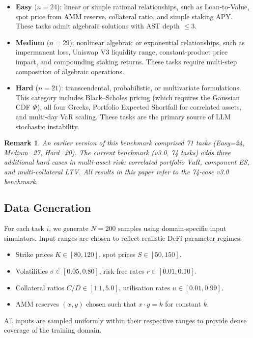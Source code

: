 \documentclass[twoside,11pt]{article}
\newtheorem{remark}[theorem]{Remark}
\begin{document}
\begin{itemize}
  \item \textbf{Easy} ($n=24$): linear or simple rational relationships, such as
    Loan-to-Value, spot price from AMM reserve, collateral ratio, and simple staking APY.
    These tasks admit algebraic solutions with AST depth $\le 3$.

  \item \textbf{Medium} ($n=29$): nonlinear algebraic or exponential relationships,
    such as impermanent loss, Uniswap V3 liquidity range, constant-product price impact,
    and compounding staking returns.  These tasks require multi-step composition
    of algebraic operations.

  \item \textbf{Hard} ($n=21$): transcendental, probabilistic, or multivariate
    formulations.  This category includes Black--Scholes pricing (which requires
    the Gaussian CDF $\Phi$), all four Greeks, Portfolio Expected Shortfall for
    correlated assets, and multi-day VaR scaling.  These tasks are the primary
    source of LLM stochastic instability.
\end{itemize}

\begin{remark}
An earlier version of this benchmark comprised 71 tasks (Easy=24, Medium=27,
Hard=20).  The current benchmark (v3.0, 74 tasks) adds three additional hard
cases in multi-asset risk: correlated portfolio VaR, component ES, and
multi-collateral LTV.  All results in this paper refer to the 74-case v3.0 benchmark.
\end{remark}

\subsection{Data Generation}

For each task $i$, we generate $N=200$ samples using domain-specific input
simulators.  Input ranges are chosen to reflect realistic DeFi parameter regimes:
\begin{itemize}
  \item Strike prices $K \in [80, 120]$, spot prices $S \in [50, 150]$.
  \item Volatilities $\sigma \in [0.05, 0.80]$, risk-free rates $r \in [0.01, 0.10]$.
  \item Collateral ratios $C/D \in [1.1, 5.0]$, utilisation rates $u \in [0.01, 0.99]$.
  \item AMM reserves $(x, y)$ chosen such that $x \cdot y = k$ for constant $k$.
\end{itemize}
All inputs are sampled uniformly within their respective ranges to provide dense
coverage of the training domain.
\end{document}
